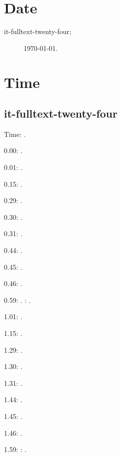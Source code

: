 \documentclass[italian]{article}
\begin{document}
\section{Date}

\begin{description}
\item[it-fulltext-twenty-four;]
\today.
\end{description}

\section{Time}
\subsection{it-fulltext-twenty-four}
Time: \DTMcurrenttime.

0.00:  .

0.01:   . 

0.15:   . 

0.29:   . 

0.30:   .

0.31:   .

0.44:   .

0.45:   .

0.46:   .

0.59:   .
:  .

1.01:   . 

1.15:   . 

1.29:   . 

1.30:   .

1.31:   .

1.44:   .

1.45:   .

1.46:   .

1.59:   
:  .
\end{document}
